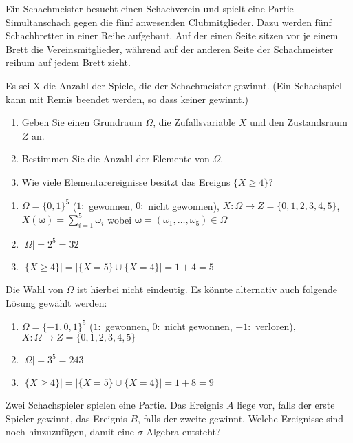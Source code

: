 Ein Schachmeister besucht einen Schachverein und spielt eine Partie Simultanschach gegen
die fünf anwesenden Clubmitglieder. Dazu werden fünf Schachbretter in einer Reihe aufgebaut.
Auf der einen Seite sitzen vor je einem Brett die Vereinsmitglieder, während auf der anderen
Seite der Schachmeister reihum auf jedem Brett zieht.

Es sei X die Anzahl der Spiele, die der Schachmeister gewinnt. (Ein Schachspiel kann mit
Remis beendet werden, so dass keiner gewinnt.)
\begin{enumerate}
    \item Geben Sie einen Grundraum $\Omega$, die Zufallsvariable $X$ und den Zustandsraum $Z$ an.
    \item Bestimmen Sie die Anzahl der Elemente von $\Omega$.
    \item Wie viele Elementarereignisse besitzt das Ereigns $\{X \ge 4\}$?
\end{enumerate}

\solution
\begin{enumerate}
    \item $\Omega = \{0,1\}^5$ ($1:$ gewonnen, $0:$ nicht gewonnen), $X:\Omega\to Z=\{0,1,2,3,4,5\}$, $X(\mathbf \omega) = \sum_{i=1}^5 \omega_i$ wobei $\mathbf \omega = (\omega_1,\hdots,\omega_5)\in\Omega$
    \item $|\Omega|=2^5=32$
    \item $|\{X\ge4\}| = |\{X=5\} \cup \{X=4\}| = 1 + 4 = 5$
\end{enumerate}
Die Wahl von $\Omega$ ist hierbei nicht eindeutig. Es könnte alternativ auch folgende Lösung gewählt werden:
\begin{enumerate}
    \item $\Omega = \{-1,0,1\}^5$ ($1:$ gewonnen, $0:$ nicht gewonnen, $-1:$ verloren),
          $X:\Omega\to Z=\{0,1,2,3,4,5\}$
    \item $|\Omega|=3^5=243$
    \item $|\{X\ge4\}| = |\{X=5\} \cup \{X=4\}| = 1 + 8 = 9$
\end{enumerate}



 Zwei Schachspieler spielen eine
Partie. Das Ereignis $A$ liege vor, falls der erste Spieler gewinnt, das
Ereignis $B$, falls der zweite gewinnt. Welche Ereignisse sind noch
hinzuzufügen, damit eine $\sigma$-Algebra entsteht?

